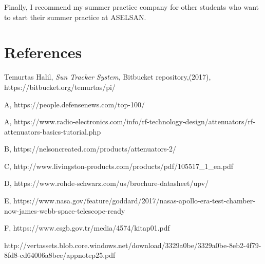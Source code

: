 	
	Finally, I recommend my summer practice company for other students who want to start their summer practice at ASELSAN. 

\-\vfill 


\section{References}

\begingroup
\renewcommand{\section}[2]{}%
\begin{thebibliography}{}

 Temurtas Halil,
	\textit{Sun Tracker System},
	Bitbucket repository,(2017),
	https://bitbucket.org/temurtas/pi/
	
	A,	
https://people.defensenews.com/top-100/	
	
	A,
	https://www.radio-electronics.com/info/rf-technology-design/attenuators/rf-attenuators-basics-tutorial.php

	B,
	https://nelsoncreated.com/products/attenuators-2/ 

	C,
	http://www.livingston-products.com/products/pdf/105517\_1\_en.pdf

	D,
	https://www.rohde-schwarz.com/us/brochure-datasheet/upv/

	E,
	https://www.nasa.gov/feature/goddard/2017/nasas-apollo-era-test-chamber-now-james-webb-space-telescope-ready

	F,
https://www.csgb.gov.tr/media/4574/kitap01.pdf


http://vertassets.blob.core.windows.net/download/3329a0be/3329a0be-8eb2-4f79-8fd8-cd64006a8bce/appnotep25.pdf


\end{thebibliography}
\endgroup

\vfill


\appendix









